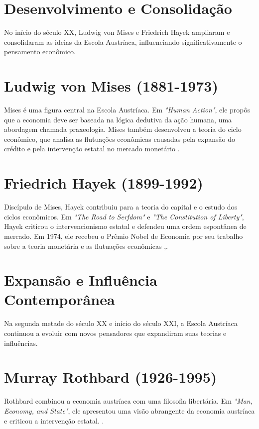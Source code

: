 \section*{Desenvolvimento e Consolidação}

No início do século XX, Ludwig von Mises e Friedrich Hayek ampliaram e consolidaram as ideias da Escola Austríaca, influenciando significativamente o pensamento econômico.

\section*{Ludwig von Mises (1881-1973)}
Mises é uma figura central na Escola Austríaca. Em \textit{"Human Action"}, ele propôs que a economia deve ser baseada na lógica dedutiva da ação humana, uma abordagem chamada praxeologia. Mises também desenvolveu a teoria do ciclo econômico, que analisa as flutuações econômicas causadas pela expansão do crédito e pela intervenção estatal no mercado monetário \cite{mises1949human}.

\section*{Friedrich Hayek (1899-1992)}
Discípulo de Mises, Hayek contribuiu para a teoria do capital e o estudo dos ciclos econômicos. Em \textit{"The Road to Serfdom"} e \textit{"The Constitution of Liberty"}, Hayek criticou o intervencionismo estatal e defendeu uma ordem espontânea de mercado. Em 1974, ele recebeu o Prêmio Nobel de Economia por seu trabalho sobre a teoria monetária e as flutuações econômicas \cite{hayek1944road},\cite{hayek1960constitution}.

\section*{Expansão e Influência Contemporânea}

Na segunda metade do século XX e início do século XXI, a Escola Austríaca continuou a evoluir com novos pensadores que expandiram suas teorias e influências.

\section*{Murray Rothbard (1926-1995)}
Rothbard combinou a economia austríaca com uma filosofia libertária. Em \textit{"Man, Economy, and State"}, ele apresentou uma visão abrangente da economia austríaca e criticou a intervenção estatal. \cite{rothbard1962man}.

